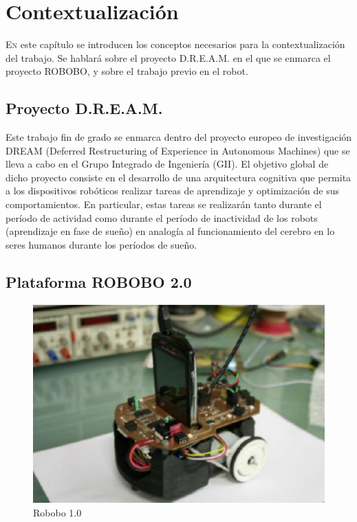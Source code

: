 \chapter{Contextualización}
\label{chap:contextualizacion}
\vspace{0.5cm}


\lettrine{E}{n} este capítulo se introducen los conceptos necesarios para la contextualización del trabajo. Se hablará sobre el proyecto D.R.E.A.M.\cite{dream_project} en el que se enmarca el proyecto ROBOBO, y sobre el trabajo previo en el robot.


\section{Proyecto D.R.E.A.M.}
\label{sec:dreamproyect}
Este trabajo fin de grado se enmarca dentro del proyecto europeo de investigación DREAM (Deferred Restructuring of Experience in Autonomous Machines) que se lleva a cabo en el Grupo Integrado de Ingeniería (GII). El objetivo global de dicho proyecto consiste en el desarrollo de una arquitectura cognitiva que permita a los dispositivos robóticos realizar tareas de aprendizaje y optimización de sus comportamientos. En particular, estas tareas se realizarán tanto durante el período de actividad como durante el período de inactividad de los robots (aprendizaje en fase de sueño) en analogía al funcionamiento del cerebro en lo seres humanos durante los períodos de sueño.

\section{Plataforma ROBOBO 2.0}
\label{sec:roboboplatform}

\begin{figure}
	\centering
	\includegraphics[width=0.8\linewidth]{imagenes/robobo1_0.PNG}
	\caption{Robobo 1.0}
	\label{fig:robobo_1_0}
\end{figure}

